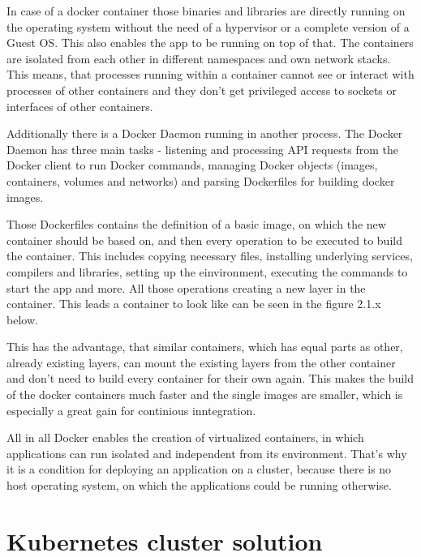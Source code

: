 In case of a docker container those binaries and libraries are directly running on the operating system without the need of a hypervisor or a complete version of a Guest OS. This also enables the app to be running on top of that. The containers are isolated from each other in different namespaces and own network stacks. This means, that processes running within a container cannot see or interact with processes of other containers and they don't get privileged access to sockets or interfaces of other containers.


Additionally there is a Docker Daemon running in another process. The Docker Daemon has three main tasks - listening and processing API requests from the Docker client to run Docker commands, managing Docker objects (images, containers, volumes and networks) and parsing Dockerfiles for building docker images.


Those Dockerfiles contains the definition of a basic image, on which the new container should be based on, and then every operation to be executed to build the container. This includes copying necessary files, installing underlying services, compilers and libraries, setting up the einvironment, executing the commands to start the app and more. All those operations creating a new layer in the container. This leads a container to look like can be seen in the figure 2.1.x below.


This has the advantage, that similar containers, which has equal parts as other, already existing layers, can mount the existing layers from the other container and don't need to build every container for their own again. This makes the build of the docker containers much faster and the single images are smaller, which is especially a great gain for continious inntegration.


All in all Docker enables the creation of virtualized containers, in which applications can run isolated and independent from its environment. That's why it is a condition for deploying an application on a cluster, because there is no host operating system, on which the applications could be running otherwise.


\section{Kubernetes cluster solution}

